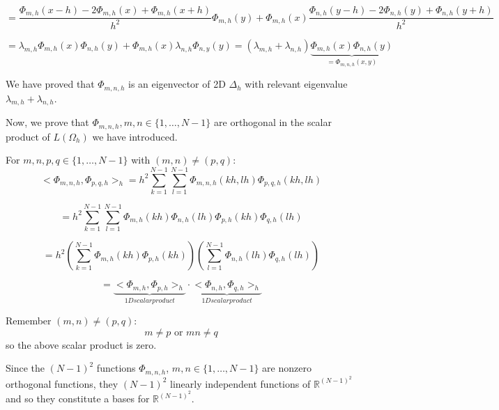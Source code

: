 \begin{equation*}
= \frac{\Phi_{m,h}(x - h) - 2 \Phi_{m,h}(x) + \Phi_{m,h}(x+h) }{h^2} \Phi_{m,h}(y) +  \Phi_{m,h}(x) \frac{\Phi_{n,h}(y - h) - 2\Phi_{n,h}(y) + \Phi_{n,h}(y+h)}{h^2}
\end{equation*}

\begin{equation*}
= \lambda_{m,h} \Phi_{m,h}(x) \Phi_{n,h}(y) + \Phi_{m,h}(x) \lambda_{n,h} \Phi_{n,y}(y) = (\lambda_{m,h} + \lambda_{n,h}) \underbrace{\Phi_{m,h}(x) \Phi_{n,h}(y)}_{= \Phi_{m,n,h}(x,y)}
\end{equation*}

We have proved that $\Phi_{m,n,h}$ is an eigenvector of 2D $\Delta_h$ with relevant eigenvalue $\lambda_{m, h} + \lambda_{n,h}$.

Now, we prove that $\Phi_{m,n,h}, m,n \in \{1, \dots, N-1\}$ are orthogonal in the scalar product of $L(\Omega_h)$ we have introduced.

For $m,n,p,q \in \{1, \dots, N-1\}$ with $(m, n) \neq (p, q)$:
\begin{equation*}
<\Phi_{m,n,h}, \Phi_{p,q,h}>_h = h^2 \sum_{k=1}^{N-1} \sum_{l=1}^{N-1} \Phi_{m,n,h}(kh, lh) \Phi_{p,q,h}(kh, lh)
\end{equation*}

\begin{equation*}
= h^2 \sum_{k=1}^{N-1} \sum_{l=1}^{N-1} \Phi_{m,h}(kh)\Phi_{n,h}(lh) \Phi_{p,h}(kh)\Phi_{q,h}(lh)
\end{equation*}

\begin{equation*}
= h^2 (\sum_{k=1}^{N-1} \Phi_{m,h}(kh)\Phi_{p,h}(kh)) (\sum_{l=1}^{N-1} \Phi_{n,h}(lh)\Phi_{q,h}(lh))
\end{equation*}

\begin{equation*}
= \underbrace{<\Phi_{m,h}, \Phi_{p,h}>_h}_{1D scalar product} \cdot \underbrace{<\Phi_{n,h}, \Phi_{q,h}>_h}_{1D scalar product}
\end{equation*}

Remember $(m,n) \neq (p, q)$:
\begin{equation*}
m \neq p \text{ or } m n \neq q
\end{equation*}
so the above scalar product is zero.

Since the $(N-1)^2$ functions $\Phi_{m,n,h}$, $m,n \in \{1, \dots, N-1\}$ are nonzero orthogonal functions, they $(N-1)^2$ linearly independent functions of $\mathbb{R}^{(N-1)^2}$ and so they constitute a bases for $\mathbb{R}^{(N-1)^2}$.

